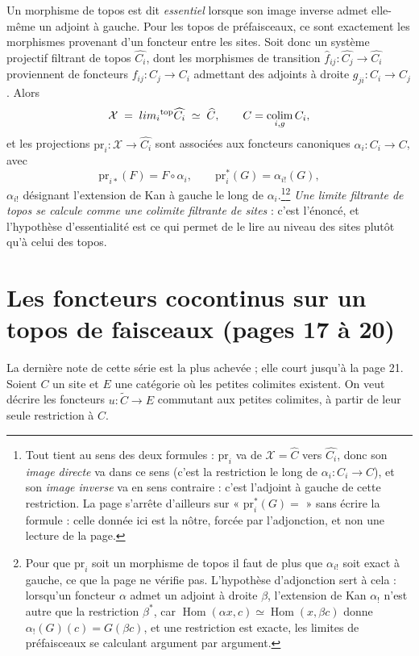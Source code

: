 \documentclass[11pt,a4paper]{article}
\begin{document}
Un morphisme de topos est dit \emph{essentiel} lorsque son image inverse admet
elle-même un adjoint à gauche. Pour les topos de préfaisceaux, ce sont
exactement les morphismes provenant d'un foncteur entre les sites. Soit donc un
système projectif filtrant de topos $\widehat{C_{i}}$, dont les morphismes de
transition $\widehat{f}_{ij} : \widehat{C_{j}} \to \widehat{C_{i}}$ proviennent
de foncteurs $f_{ij} : C_{j} \to C_{i}$ admettant des adjoints à droite
$g_{ji} : C_{i} \to C_{j}$. Alors
\[
\mathcal{X} \;=\; \varprojlim_{i}{}^{\mathrm{top}} \widehat{C_{i}}
\;\simeq\; \widehat{C}, \qquad C = \operatorname*{colim}_{i, g} C_{i},
\]
et les projections $\mathrm{pr}_{i} : \mathcal{X} \to \widehat{C_{i}}$ sont
associées aux foncteurs canoniques $\alpha_{i} : C_{i} \to C$, avec
\[
\mathrm{pr}_{i*}(F) = F \circ \alpha_{i}, \qquad
\mathrm{pr}_{i}^{*}(G) = \alpha_{i!}(G),
\]
$\alpha_{i!}$ désignant l'extension de Kan à gauche le long de
$\alpha_{i}$.\footnote{Tout tient au sens des deux formules : $\mathrm{pr}_{i}$ va de
$\mathcal{X} = \widehat{C}$ vers $\widehat{C_{i}}$, donc son \emph{image
directe} va dans ce sens (c'est la restriction le long de
$\alpha_{i} : C_{i} \to C$), et son \emph{image inverse} va en sens contraire :
c'est l'adjoint à gauche de cette restriction. La page s'arrête d'ailleurs sur
« $\mathrm{pr}_{i}^{*}(G) =$ » sans écrire la formule : celle donnée ici est la
nôtre, forcée par l'adjonction, et non une lecture de la page.}\footnote{Pour
que $\mathrm{pr}_{i}$ soit un morphisme de topos il faut de plus que
$\alpha_{i!}$ soit exact à gauche, ce que la page ne vérifie pas. L'hypothèse
d'adjonction sert à cela : lorsqu'un foncteur
$\alpha$ admet un adjoint à droite $\beta$, l'extension de Kan $\alpha_{!}$
n'est autre que la restriction $\beta^{*}$, car
$\operatorname{Hom}(\alpha x, c) \simeq \operatorname{Hom}(x, \beta c)$ donne
$\alpha_{!}(G)(c) = G(\beta c)$, et une restriction est exacte, les limites de
préfaisceaux se calculant argument par argument.} \emph{Une limite filtrante de topos se
calcule comme une colimite filtrante de sites} : c'est l'énoncé, et l'hypothèse
d'essentialité est ce qui permet de le lire au niveau des sites plutôt qu'à
celui des topos.

\section*{Les foncteurs cocontinus sur un topos de faisceaux (pages 17 à 20)}

La dernière note de cette série est la plus achevée ; elle court
jusqu'à la page 21. Soient $C$ un site et $E$ une catégorie où les petites colimites
existent. On veut décrire les foncteurs $u : \widetilde{C} \to E$ commutant aux
petites colimites, à partir de leur seule restriction à $C$.
\end{document}
